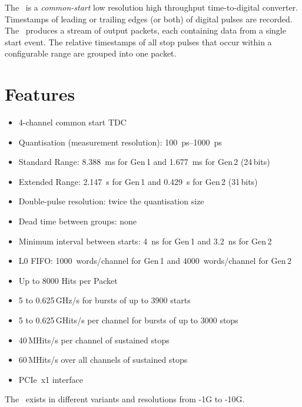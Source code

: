 The \deviceName\ is a \emph{common-start} low resolution high throughput
time-to-digital converter.  Timestamps of leading or trailing edges (or both)
of digital pulses are recorded.  The \deviceName\ produces a stream of output
packets, each containing data from a single start event.  The relative
timestamps of all stop pulses that occur within a configurable range are
grouped into one packet.

\section{Features} \label{sec:features}
\begin{itemize}
    \item 4-channel common start TDC
    \item Quantisation (measurement resolution):
        \SIrange{100}{1000}{\pico\second}
    \item Standard Range: \SI{8.388}{\milli\second} for Gen\,1 and
        \SI{1.677}{\milli\second} for Gen\,2 (24\,bits)
    \item Extended Range: \SI{2.147}{\second} for Gen\,1 and
        \SI{0.429}{\second} for Gen\,2 (31\,bits)
    \item Double-pulse resolution: twice the quantisation size
    \item Dead time between groups: none
    \item Minimum interval between starts: \SI{4}{\nano\second} for Gen\,1
        and \SI{3.2}{\nano\second} for Gen\,2
    \item L0 FIFO: 1000~words/channel for Gen\,1 and 4000~words/channel for
        Gen\,2
    \item Up to 8000 Hits per Packet
    \item 5 to 0.625\,GHz/s for bursts of up to 3900 starts
    \item 5 to 0.625\,GHits/s per channel for bursts of up to 3000 stops
    \item 40\,MHits/s per channel of sustained stops
    \item 60\,MHits/s over all channels of sustained stops
    \item PCIe~x1 interface
\end{itemize} 

The \deviceName\ exists in different variants and resolutions from
\deviceName-1G to \deviceName-10G.  


